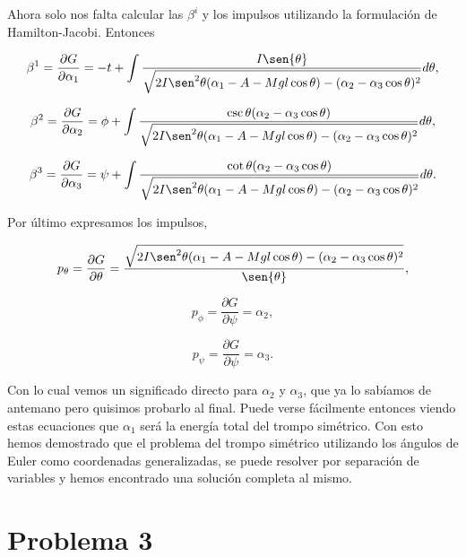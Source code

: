 \documentclass[a4paper,10pt]{article}
\numberwithin{equation}{section}
\begin{document}
Ahora solo nos falta calcular las $\beta^i$ y los impulsos utilizando la formulación 
de Hamilton-Jacobi. Entonces 

\begin{equation}
 \beta^1 = \frac{\partial G}{\partial \alpha_1} = 
 - t + \int \frac{I\sen{\theta}}{\sqrt{2I\sen^2{\theta}(\alpha_1 - A - 
 Mgl\cos{\theta}) - (\alpha_2 - \alpha_3\cos{\theta})^2}}d\theta,
\end{equation}

\begin{equation}
 \beta^2 = \frac{\partial G}{\partial \alpha_2} = 
 \phi + \int \frac{\csc{\theta}(\alpha_2 - \alpha_3\cos{\theta})}{\sqrt{2I\sen^2{\theta}(\alpha_1 - A - 
 Mgl\cos{\theta}) - (\alpha_2 - \alpha_3\cos{\theta})^2}}d\theta,
\end{equation}

\begin{equation}
 \beta^3 = \frac{\partial G}{\partial \alpha_3} = 
 \psi + \int \frac{\cot{\theta}(\alpha_2 - \alpha_3\cos{\theta})}{\sqrt{2I\sen^2{\theta}(\alpha_1 - A - 
 Mgl\cos{\theta}) - (\alpha_2 - \alpha_3\cos{\theta})^2}}d\theta.
\end{equation}

Por último expresamos los impulsos,

\begin{equation}
 p_\theta = \frac{\partial G}{\partial \theta} = 
 \frac{\sqrt{2I\sen^2{\theta}(\alpha_1 - A - 
 Mgl\cos{\theta}) - (\alpha_2 - \alpha_3\cos{\theta})^2}}{\sen{\theta}},
\end{equation}

\begin{equation}
 p_\phi = \frac{\partial G}{\partial \psi} = \alpha_2,
\end{equation}

\begin{equation}
 p_\psi = \frac{\partial G}{\partial \psi} = \alpha_3.
\end{equation}

Con lo cual vemos un significado directo para $\alpha_2$ y $\alpha_3$, que ya lo sabíamos 
de antemano pero quisimos probarlo al final. Puede verse fácilmente entonces viendo 
estas ecuaciones que $\alpha_1$ será la energía total del trompo simétrico. Con esto
hemos demostrado que el problema del trompo simétrico utilizando los ángulos 
de Euler como coordenadas generalizadas, se puede resolver por separación 
de variables y hemos encontrado una solución completa al mismo.

\section{Problema 3}
\end{document}

